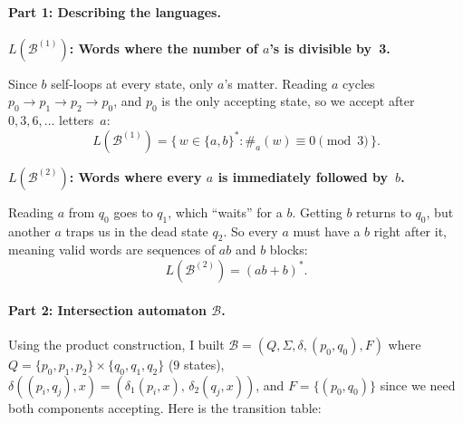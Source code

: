 \documentclass{article}
\theoremstyle{theorem}
\theoremstyle{definition}
\theoremstyle{remark}
\begin{document}
\begin{center}
\end{center}

\paragraph{Part 1: Describing the languages.}

\textbf{$L(\mathcal{B}^{(1)})$: Words where the number of $a$'s is divisible by~3.}

Since $b$ self-loops at every state, only $a$'s matter. Reading $a$ cycles $p_0 \to p_1 \to p_2 \to p_0$, and $p_0$ is the only accepting state, so we accept after $0, 3, 6, \ldots$ letters~$a$:
\[
  L(\mathcal{B}^{(1)}) = \{\, w \in \{a,b\}^* : \#_a(w) \equiv 0 \pmod{3} \,\}.
\]

\textbf{$L(\mathcal{B}^{(2)})$: Words where every $a$ is immediately followed by~$b$.}

Reading $a$ from $q_0$ goes to $q_1$, which ``waits'' for a $b$. Getting $b$ returns to $q_0$, but another $a$ traps us in the dead state $q_2$. So every $a$ must have a $b$ right after it, meaning valid words are sequences of $ab$ and $b$ blocks:
\[
  L(\mathcal{B}^{(2)}) = (ab + b)^*.
\]

\paragraph{Part 2: Intersection automaton $\mathcal{B}$.}

Using the product construction, I built $\mathcal{B} = (Q, \Sigma, \delta, (p_0, q_0), F)$ where $Q = \{p_0, p_1, p_2\} \times \{q_0, q_1, q_2\}$ ($9$ states), $\delta((p_i, q_j), x) = (\delta_1(p_i, x),\, \delta_2(q_j, x))$, and $F = \{(p_0, q_0)\}$ since we need both components accepting. Here is the transition table:
\end{document}
